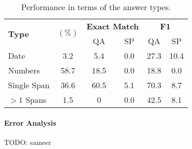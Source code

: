 \begin{table}
    \centering
    \small
    \begin{tabular}{lccccc}
    \toprule
    \multirow{2}{*}{\bf Type} & \multirow{2}{*}{$(\%)$} &\multicolumn{2}{c}{\bf Exact Match} & \multicolumn{2}{c}{\bf F1} \\
    & & QA & SP & QA &  SP \\
    \midrule
    Date        & 3.2  & 5.4   & 0.0 & 27.3  & 10.4\\
    Numbers     & 58.7 & 18.5  & 0.0 & 18.8  & 0.0 \\
    Single Span & 36.6 & 60.5  & 5.1 & 70.3  & 8.7 \\
    $>1$ Spans  & 1.5  & 0     & 0.0 & 42.5  & 8.1 \\
    \bottomrule
    \end{tabular}
    \caption{Performance in terms of the answer types.}
    \label{tab:my_label}
\end{table}


\paragraph{Error Analysis}

TODO: sameer

